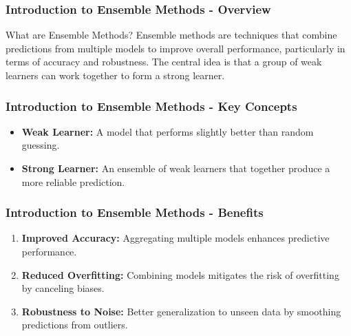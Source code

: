\documentclass{beamer}
\begin{document}
\begin{frame}[fragile]
    \frametitle{Introduction to Ensemble Methods - Overview}
    \begin{block}{What are Ensemble Methods?}
        Ensemble methods are techniques that combine predictions from multiple models to improve overall performance, particularly in terms of accuracy and robustness. The central idea is that a group of weak learners can work together to form a strong learner.
    \end{block}
\end{frame}

\begin{frame}[fragile]
    \frametitle{Introduction to Ensemble Methods - Key Concepts}
    \begin{itemize}
        \item \textbf{Weak Learner:} A model that performs slightly better than random guessing. 
        \item \textbf{Strong Learner:} An ensemble of weak learners that together produce a more reliable prediction.
    \end{itemize}
\end{frame}

\begin{frame}[fragile]
    \frametitle{Introduction to Ensemble Methods - Benefits}
    \begin{enumerate}
        \item \textbf{Improved Accuracy:} Aggregating multiple models enhances predictive performance.
        \item \textbf{Reduced Overfitting:} Combining models mitigates the risk of overfitting by canceling biases.
        \item \textbf{Robustness to Noise:} Better generalization to unseen data by smoothing predictions from outliers.
    \end{enumerate}
\end{frame}
\end{document}
